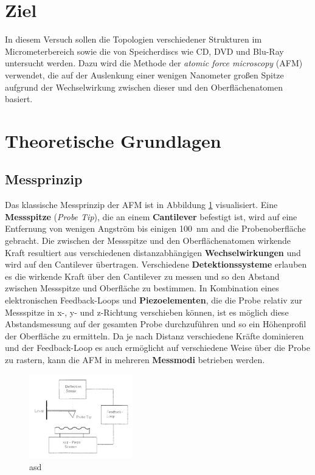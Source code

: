 \section{Ziel}
    In diesem Versuch sollen die Topologien verschiedener Strukturen im Micrometerbereich sowie die von Speicherdiscs wie CD, DVD und Blu-Ray untersucht werden. Dazu wird die Methode der \textit{atomic force
    microscopy} (AFM) verwendet, die auf der Auslenkung einer wenigen Nanometer großen Spitze aufgrund der Wechselwirkung zwischen dieser und den Oberflächenatomen basiert.    
    
\section{Theoretische Grundlagen}
    \subsection{Messprinzip}
        Das klassische Messprinzip der AFM ist in Abbildung \ref{fig:prinzip} visualisiert. Eine \textbf{Messspitze} (\textit{Probe Tip}), die an einem \textbf{Cantilever} befestigt ist, wird auf eine 
        Entfernung von wenigen Angström bis einigen \SI{100}{\nano\metre} and die Probenoberfläche gebracht. Die zwischen der Messspitze und den Oberflächenatomen wirkende Kraft resultiert aus verschiedenen
        distanzabhängigen \textbf{Wechselwirkungen} und wird auf den Cantilever übertragen. Verschiedene \textbf{Detektionssysteme} erlauben es die wirkende Kraft über den Cantilever zu messen und so den 
        Abstand zwischen Messspitze und Oberfläche zu bestimmen. In Kombination eines elektronischen Feedback-Loops und \textbf{Piezoelementen}, die die Probe relativ zur Messspitze in x-, y- und z-Richtung
        verschieben können, ist es möglich diese Abstandsmessung auf der gesamten Probe durchzuführen und so ein Höhenprofil der Oberfläche zu ermitteln. Da je nach Distanz verschiedene Kräfte dominieren und
        der Feedback-Loop es auch ermöglicht auf verschiedene Weise über die Probe zu rastern, kann die AFM in mehreren \textbf{Messmodi} betrieben werden.

        \FloatBarrier

        \begin{figure}[h]
          \centering
          \includegraphics[width = 0.4\textwidth]{pictures/prinzip.png}
          \caption{asd}
          \label{fig:prinzip}
        \end{figure}
    
